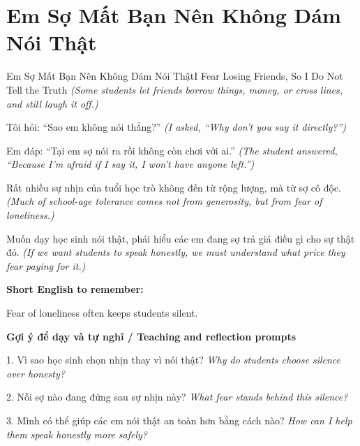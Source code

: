 \section{Em Sợ Mất Bạn Nên Không Dám Nói Thật}
\begin{truyen}{Em Sợ Mất Bạn Nên Không Dám Nói Thật}{I Fear Losing Friends, So I Do Not Tell the Truth}
\textit{(Some students let friends borrow things, money, or cross lines, and still laugh it off.)}

Tôi hỏi: “Sao em không nói thẳng?”
\textit{(I asked, “Why don't you say it directly?”)}

Em đáp: “Tại em sợ nói ra rồi không còn chơi với ai.”
\textit{(The student answered, “Because I'm afraid if I say it, I won't have anyone left.”)}

Rất nhiều sự nhịn của tuổi học trò không đến từ rộng lượng, mà từ sợ cô độc.
\textit{(Much of school-age tolerance comes not from generosity, but from fear of loneliness.)}

\end{truyen}

\begin{baihoc}
Muốn dạy học sinh nói thật, phải hiểu các em đang sợ trả giá điều gì cho sự thật đó.
\textit{(If we want students to speak honestly, we must understand what price they fear paying for it.)}
\end{baihoc}

\begin{ghinhoanh}
\textbf{Short English to remember:}

Fear of loneliness often keeps students silent.

\end{ghinhoanh}

\begin{tuhocnhanh}
\textbf{Gợi ý để dạy và tự nghĩ / Teaching and reflection prompts}

1. Vì sao học sinh chọn nhịn thay vì nói thật? \textit{Why do students choose silence over honesty?}

2. Nỗi sợ nào đang đứng sau sự nhịn này? \textit{What fear stands behind this silence?}

3. Mình có thể giúp các em nói thật an toàn hơn bằng cách nào? \textit{How can I help them speak honestly more safely?}
\end{tuhocnhanh}
\ngancach

